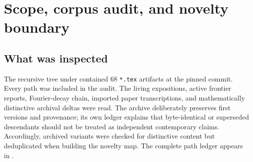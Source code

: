 \documentclass[11pt,oneside]{article}
\theoremstyle{definition}
\theoremstyle{remark}
\begin{document}
\begin{abstract}
Parseval turns the same norm law into a second, frequency-side geometry.  The pushforward of
$|\Phi(\xi)|^2\Differential\xi/\Norm{\RvachevUp}_2^2$ by $z=(2\pi\xi)^2$ has moments
\[
 m_n=2^{n(n+1)}=q^{-n(n+1)/2},\qquad q=\frac14.
\]
It is therefore an explicit nonclassical representing measure for a shifted
Stieltjes--Wigert moment problem.  A lognormal measure has the same moments but a different
density, proving indeterminacy directly.  We calculate the Hankel determinants, monic
orthogonal polynomials, recurrence coefficients, and Gaussian-$q$-binomial formulae, and
derive the spectral $q$-Pearson law
\[
 w_{\rm sp}(4z)=\frac12\SincRad^2(\sqrt z)\,w_{\rm sp}(z).
\]
The report closes with numerical checks, explicit conjectures, a phase-locked confluent
$q$-Richardson program, and a Lean formalization roadmap.  Claims labelled ``new'' are new
relative to the pinned repository corpus after a formula- and terminology-level collision
audit; no universal publication-priority claim is made.
\end{abstract}


\newpage

\section{Scope, corpus audit, and novelty boundary}
\label{p4:sec:scope}

\subsection{What was inspected}

The recursive tree under \RepoRoot{} contained $68$ \texttt{*.tex} artifacts at the pinned
commit.  Every path was included in the audit.  The living expositions, active frontier
reports, Fourier-decay chain, imported paper transcriptions, and mathematically distinctive
archival deltas were read.  The archive deliberately preserves first versions and provenance;
its own ledger explains that byte-identical or superseded descendants should not be treated as
independent contemporary claims.  Accordingly, archived variants were checked for distinctive
content but deduplicated when building the novelty map.  The complete path ledger appears in
.
\end{document}

